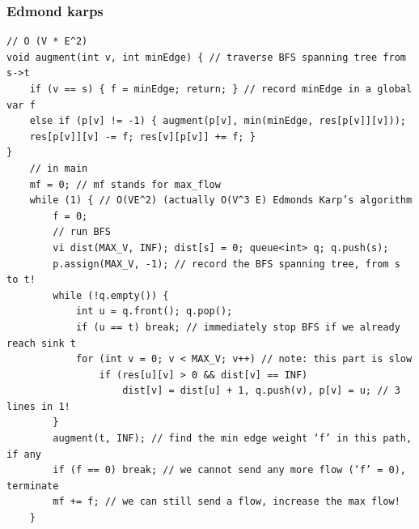 \documentclass[8pt, a4paper, oneside, twocolumn]{extarticle}
\begin{document}
\subsubsection{Edmond karps}
\begin{verbatim}
// O (V * E^2)
void augment(int v, int minEdge) { // traverse BFS spanning tree from s->t
    if (v == s) { f = minEdge; return; } // record minEdge in a global var f
    else if (p[v] != -1) { augment(p[v], min(minEdge, res[p[v]][v]));
    res[p[v]][v] -= f; res[v][p[v]] += f; }
}
    // in main
    mf = 0; // mf stands for max_flow
    while (1) { // O(VE^2) (actually O(V^3 E) Edmonds Karp’s algorithm
        f = 0;
        // run BFS
        vi dist(MAX_V, INF); dist[s] = 0; queue<int> q; q.push(s);
        p.assign(MAX_V, -1); // record the BFS spanning tree, from s to t!
        while (!q.empty()) {
            int u = q.front(); q.pop();
            if (u == t) break; // immediately stop BFS if we already reach sink t
            for (int v = 0; v < MAX_V; v++) // note: this part is slow
                if (res[u][v] > 0 && dist[v] == INF)
                    dist[v] = dist[u] + 1, q.push(v), p[v] = u; // 3 lines in 1!
        }
        augment(t, INF); // find the min edge weight ‘f’ in this path, if any
        if (f == 0) break; // we cannot send any more flow (‘f’ = 0), terminate
        mf += f; // we can still send a flow, increase the max flow!
    }
\end{verbatim}
\end{document}
